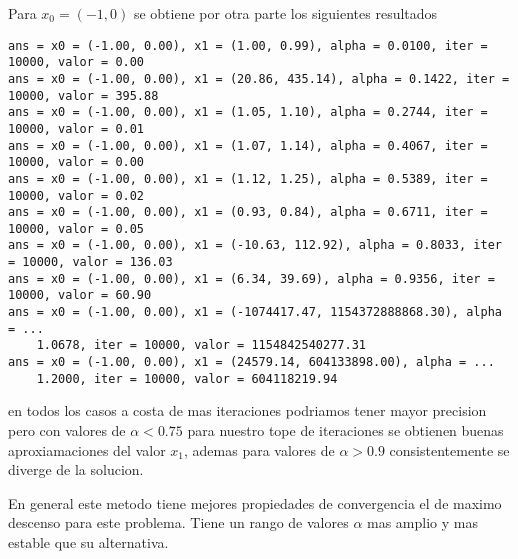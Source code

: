 \documentclass[letterpaper]{article}
\begin{document}
Para \(x_0 = (-1,0)\) se obtiene por otra parte los siguientes resultados
\begin{verbatim}
ans = x0 = (-1.00, 0.00), x1 = (1.00, 0.99), alpha = 0.0100, iter = 10000, valor = 0.00
ans = x0 = (-1.00, 0.00), x1 = (20.86, 435.14), alpha = 0.1422, iter = 10000, valor = 395.88
ans = x0 = (-1.00, 0.00), x1 = (1.05, 1.10), alpha = 0.2744, iter = 10000, valor = 0.01
ans = x0 = (-1.00, 0.00), x1 = (1.07, 1.14), alpha = 0.4067, iter = 10000, valor = 0.00
ans = x0 = (-1.00, 0.00), x1 = (1.12, 1.25), alpha = 0.5389, iter = 10000, valor = 0.02
ans = x0 = (-1.00, 0.00), x1 = (0.93, 0.84), alpha = 0.6711, iter = 10000, valor = 0.05
ans = x0 = (-1.00, 0.00), x1 = (-10.63, 112.92), alpha = 0.8033, iter = 10000, valor = 136.03
ans = x0 = (-1.00, 0.00), x1 = (6.34, 39.69), alpha = 0.9356, iter = 10000, valor = 60.90
ans = x0 = (-1.00, 0.00), x1 = (-1074417.47, 1154372888868.30), alpha = ...
    1.0678, iter = 10000, valor = 1154842540277.31
ans = x0 = (-1.00, 0.00), x1 = (24579.14, 604133898.00), alpha = ...
    1.2000, iter = 10000, valor = 604118219.94
\end{verbatim}
en todos los casos a costa de mas iteraciones podriamos tener mayor
precision pero con valores de \(\alpha < 0.75\) para nuestro tope de
iteraciones se obtienen buenas aproxiamaciones del valor \(x_1\), ademas
para valores de \(\alpha > 0.9\) consistentemente se diverge de la solucion.

En general este metodo tiene mejores propiedades de convergencia el de
maximo descenso para este problema. Tiene un rango de valores \(\alpha\)
mas amplio y mas estable que su alternativa.
\end{document}
